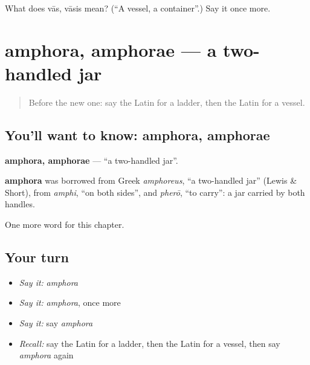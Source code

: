 \begin{tcolorbox}[breakable,colback=teal!4,colframe=teal!35!black,title={Before you move on}]
What does vās, vāsis mean? (\textquotedblleft{}A vessel, a container\textquotedblright{}.) Say it once more.
\end{tcolorbox}
\section[amphora, amphorae]{amphora, amphorae — a two-handled jar}

\label{lesson:LA-C123-amphora}



\begin{quote}
Before the new one: say the Latin for a ladder, then the Latin for a vessel.
\end{quote}

\subsection*{You'll want to know: amphora, amphorae}
\textbf{amphora, amphorae} — \textquotedblleft{}a two-handled jar\textquotedblright{}.

\begin{cousinweb}
\textbf{amphora} was borrowed from Greek \emph{amphoreus}, \textquotedblleft{}a two-handled jar\textquotedblright{} (Lewis \& Short), from \emph{amphi}, \textquotedblleft{}on both sides\textquotedblright{}, and \emph{pherō}, \textquotedblleft{}to carry\textquotedblright{}: a jar carried by both handles.
\end{cousinweb}

\begin{grammarlens}[title={What you've built}]
One more word for this chapter.
\end{grammarlens}

\subsection*{Your turn}
\begin{itemize}
\raggedright
  \item \emph{Say it:} \emph{amphora}
  \item \emph{Say it:} \emph{amphora}, once more
  \item \emph{Say it:} say \emph{amphora}
  \item \emph{Recall:} say the Latin for a ladder, then the Latin for a vessel, then say \emph{amphora} again
\end{itemize}


